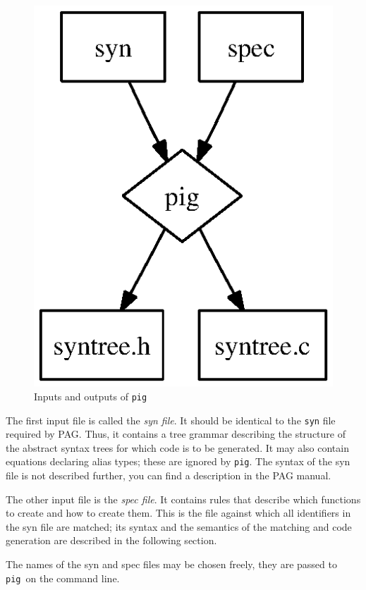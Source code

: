 \documentclass[a4paper,12pt]{article}
\def\pig{{\tt pig}}
\begin{document}
\begin{figure}
\begin{center}
\includegraphics{pig-diagram.ps}
\caption{Inputs and outputs of {\tt pig}}
\end{center}
\end{figure}

The first input file is called the {\em syn file}. It should be
identical to the \verb+syn+ file required by PAG. Thus, it contains
a tree grammar describing the structure of the abstract syntax trees
for which code is to be generated. It may also contain equations
declaring alias types; these are ignored by \pig. The syntax of the
syn file is not described further, you can find a description in the
PAG manual.

The other input file is the {\em spec file}. It contains rules that
describe which functions to create and how to create them. This is
the file against which all identifiers in the syn file are matched;
its syntax and the semantics of the matching and code generation are
described in the following section.

The names of the syn and spec files may be chosen freely, they are
passed to \pig\ on the command line.
\end{document}
